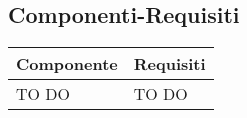 \subsection{Componenti-Requisiti} %
\label{sub:componenti_requisiti}
\begin{center}
\def\arraystretch{1.5}
\bgroup

\begin{longtable}{| p{8cm} | p{4cm} |}
\hline
\textbf{Componente} & \textbf{Requisiti} \\
\hline
TO DO   &  TO DO \\
\hline
\end{longtable}
\egroup
\end{center}
